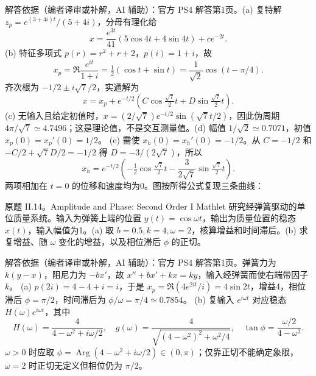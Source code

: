 \begin{solution}
解答依据（编者译审或补解，AI 辅助）：官方 PS4 解答第1页。(a) 复特解 $z_p=e^{(3+4i)t}/(5+4i)$，分母有理化给
\[
 x=\frac{e^{3t}}{41}(5\cos4t+4\sin4t)+ce^{-2t}.
\]
(b) 特征多项式 $p(r)=r^2+r+2$，$p(i)=1+i$，故
\[
 x_p=\Re\frac{e^{it}}{1+i}=\tfrac12(\cos t+\sin t)
 =\frac1{\sqrt2}\cos(t-\pi/4).
\]
齐次根为 $-1/2\pm i\sqrt7/2$，实通解为
\[
 x=x_p+e^{-t/2}(C\cos\tfrac{\sqrt7}2t+D\sin\tfrac{\sqrt7}2t).
\]
(c) 无输入且给定初值时，$x=(2/\sqrt7)e^{-t/2}\sin(\sqrt7t/2)$，因此伪周期 $4\pi/\sqrt7\simeq4.7496$；这是理论值，不是交互测量值。(d) 幅值 $1/\sqrt2\simeq0.7071$，初值 $x_p(0)=x_p'(0)=1/2$。
(e) 需使 $x_h(0)=x_h'(0)=-1/2$。从 $C=-1/2$ 和 $-C/2+\sqrt7D/2=-1/2$ 得 $D=-3/(2\sqrt7)$，所以
\[
 x_h=e^{-t/2}\left(-\tfrac12\cos\tfrac{\sqrt7}2t
 -\frac3{2\sqrt7}\sin\tfrac{\sqrt7}2t\right).
\]
两项相加在 $t=0$ 的位移和速度均为0。图按所得公式复现三条曲线：
\begin{center}\end{center}
\end{solution}
\begin{exercise}\label{cw:ps4-II-14}
原题 II.14。Amplitude and Phase: Second Order I Mathlet 研究经弹簧驱动的单位质量系统。输入为弹簧上端的位置 $y(t)=\cos\omega t$，输出为质量位置的稳态 $x(t)$，输入幅值为1。(a) 取 $b=0.5,k=4,\omega=2$，核算增益和时间滞后。(b) 求复增益、随 $\omega$ 变化的增益，以及相位滞后 $\phi$ 的正切。
\end{exercise}
\begin{solution}
解答依据（编者译审或补解，AI 辅助）：官方 PS4 解答第1页。弹簧力为 $k(y-x)$，阻尼力为 $-bx'$，故 $x''+bx'+kx=ky$，输入经弹簧而使右端带因子 $k$。
(a) $p(2i)=4-4+i=i$，于是 $x_p=\Re(4e^{2it}/i)=4\sin2t$，增益4，相位滞后 $\phi=\pi/2$，时间滞后为 $\phi/\omega=\pi/4\simeq0.7854$。
(b) 复输入 $e^{i\omega t}$ 对应稳态 $H(\omega)e^{i\omega t}$，其中
\[
 H(\omega)=\frac4{4-\omega^2+i\omega/2},\quad
 g(\omega)=\frac4{\sqrt{(4-\omega^2)^2+\omega^2/4}},\quad
 \tan\phi=\frac{\omega/2}{4-\omega^2}.
\]
$\omega>0$ 时应取 $\phi=\operatorname{Arg}(4-\omega^2+i\omega/2)\in(0,\pi)$；仅靠正切不能确定象限，$\omega=2$ 时正切无定义但相位仍为 $\pi/2$。
\end{solution}
